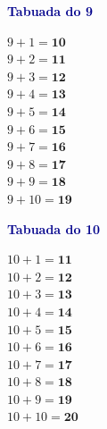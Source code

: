 \documentclass[12pt]{article}
\begin{document}
\begin{minipage}[t]{3.3cm}
\noindent\textcolor{darkblue}{\bfseries\small Tabuada do 9}\par\vspace{2pt}
{\footnotesize
$9{+}1=\mathbf{10}$\\$9{+}2=\mathbf{11}$\\$9{+}3=\mathbf{12}$\\
$9{+}4=\mathbf{13}$\\$9{+}5=\mathbf{14}$\\$9{+}6=\mathbf{15}$\\
$9{+}7=\mathbf{16}$\\$9{+}8=\mathbf{17}$\\$9{+}9=\mathbf{18}$\\
$9{+}10=\mathbf{19}$}
\end{minipage}\hfill
\begin{minipage}[t]{3.3cm}
\noindent\textcolor{darkblue}{\bfseries\small Tabuada do 10}\par\vspace{2pt}
{\footnotesize
$10{+}1=\mathbf{11}$\\$10{+}2=\mathbf{12}$\\$10{+}3=\mathbf{13}$\\
$10{+}4=\mathbf{14}$\\$10{+}5=\mathbf{15}$\\$10{+}6=\mathbf{16}$\\
$10{+}7=\mathbf{17}$\\$10{+}8=\mathbf{18}$\\$10{+}9=\mathbf{19}$\\
$10{+}10=\mathbf{20}$}
\end{minipage}
\end{document}
